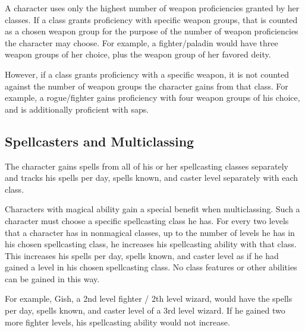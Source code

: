  A character uses only the highest number of weapon proficiencies granted by her classes. If a class grants proficiency with specific weapon groups, that is counted as a chosen weapon group for the purpose of the number of weapon proficiencies the character may choose. For example, a fighter/paladin would have three weapon groups of her choice, plus the weapon group of her favored deity.

However, if a class grants proficiency with a specific weapon, it is not counted against the number of weapon groups the character gains from that class. For example, a rogue/fighter gains proficiency with four weapon groups of his choice, and is additionally proficient with saps.

\subsection{Spellcasters and Multiclassing}\label{Spellcasters and Multiclassing}
The character gains spells from all of his or her spellcasting classes separately and tracks his spells per day, spells known, and caster level separately with each class.

Characters with magical ability gain a special benefit when multiclassing. Such a character must choose a specific spellcasting class he has. For every two levels that a character has in nonmagical classes, up to the number of levels he has in his chosen spellcasting class, he increases his spellcasting ability with that class. This increases his spells per day, spells known, and caster level as if he had gained a level in his chosen spellcasting class. No class features or other abilities can be gained in this way. 

For example, Gish, a 2nd level fighter / 2th level wizard, would have the spells per day, spells known, and caster level of a 3rd level wizard. If he gained two more fighter levels, his spellcasting ability would not increase.
